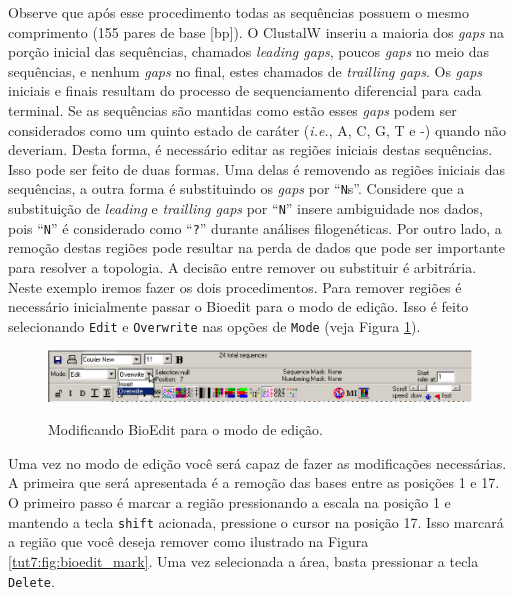 \begin{refsection}
Observe que após esse procedimento todas as sequências possuem o mesmo comprimento (155 pares de base [bp]). O ClustalW inseriu a maioria dos \textit{gaps} na porção inicial das sequências, chamados \textit{leading gaps}, poucos \textit{gaps} no meio das sequências, e nenhum \textit{gaps} no final, estes chamados de \textit{trailling gaps}. Os \textit{gaps} iniciais e finais resultam do processo de sequenciamento diferencial para cada terminal. Se as sequências são mantidas como estão esses \textit{gaps} podem ser considerados como um quinto estado de caráter (\textit{i.e.}, A, C, G, T e -) quando não deveriam. Desta forma, é necessário editar as regiões iniciais destas sequências. Isso pode ser feito de duas formas. Uma delas é removendo as regiões iniciais das sequências, a outra forma é substituindo os \textit{gaps} por ``\texttt{N}s''. Considere que a substituição de \textit{leading} e \textit{trailling gaps} por ``\texttt{N}'' insere ambiguidade nos dados, pois ``\texttt{N}'' é considerado como ``\texttt{?}'' durante análises filogenéticas. Por outro lado, a remoção destas regiões pode resultar na perda de dados que pode ser importante para resolver a topologia. A decisão entre remover ou substituir é arbitrária.\\
Neste exemplo iremos fazer os dois procedimentos. Para remover regiões é necessário inicialmente passar o Bioedit para o modo de edição. Isso é feito selecionando \texttt{Edit} e \texttt{Overwrite} nas opções de \texttt{Mode} (veja Figura \ref{tut7:fig:bioedit_mode}).

  \begin{figure}[H]
       \centering
      {\includegraphics[scale=0.5]{figures/tut7/bioedit_mode.eps}}
	{\caption[Bioedit: modo de edição]{Modificando BioEdit para o modo de edição.}\label{tut7:fig:bioedit_mode}}
  \end{figure}


Uma vez no modo de edição você será capaz de fazer as modificações necessárias. A primeira que será apresentada é a remoção das bases entre as posições 1 e 17. O primeiro passo é marcar a região pressionando a escala na posição 1 e mantendo a tecla \texttt{shift} acionada, pressione o cursor na posição 17. Isso marcará a região que você deseja remover como ilustrado na Figura \ref{tut7:fig:bioedit_mark}. Uma vez selecionada a área, basta pressionar a tecla \texttt{Delete}.


\end{refsection}
